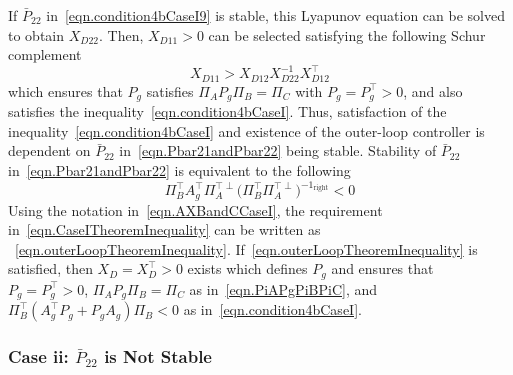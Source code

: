 \documentclass[journal]{IEEEtran}
\theoremstyle{innercustomthm}
\begin{document}
  If $\bar{P}_{22}$ in\ \eqref{eqn.condition4bCaseI9} is stable, this Lyapunov equation can be solved to obtain $X_{D22}$.
  Then, $X_{D11}>0$ can be selected satisfying the following Schur complement
  \begin{equation}
    \label{eqn.XD11}
    X_{D11} > X_{D12}X_{D22}^{-1}X_{D12}^{\top}
  \end{equation}
  which ensures that $P_{g}$ satisfies $\Pi_{A}P_{g}\Pi_{B}=\Pi_{C}$ with $P_{g}=P_{g}^{\top}>0$, and also satisfies the inequality\ \eqref{eqn.condition4bCaseI}.
  Thus, satisfaction of the inequality\ \eqref{eqn.condition4bCaseI} and existence of the outer-loop controller is dependent on $\bar{P}_{22}$ in\ \eqref{eqn.Pbar21andPbar22} being stable.
  Stability of $\bar{P}_{22}$ in\ \eqref{eqn.Pbar21andPbar22} is equivalent to the following
  \begin{equation}
    \label{eqn.CaseITheoremInequality}
    \Pi_{B}^{\top}A_{g}^{\top}\Pi_{A}^{\top\perp}\bigr(\Pi_{B}^{\top}\Pi_{A}^{\top\perp}\bigr)^{-1_{\text{right}}} < 0
  \end{equation}
  Using the notation in\ \eqref{eqn.AXBandCCaseI}, the requirement in\ \eqref{eqn.CaseITheoremInequality} can be written as
 \ \eqref{eqn.outerLoopTheoremInequality}.
  If\ \eqref{eqn.outerLoopTheoremInequality} is satisfied, then $X_{D}=X_{D}^{\top}>0$ exists which defines $P_{g}$ and ensures that $P_{g}=P_{g}^{\top}>0$, $\Pi_{A}P_{g}\Pi_{B}=\Pi_{C}$ as in\ \eqref{eqn.PiAPgPiBPiC}, and $\Pi_{B}^{\top}(A_{g}^{\top}P_{g}+P_{g}A_{g})\Pi_{B}<0$ as in\ \eqref{eqn.condition4bCaseI}.

  \subsubsection{Case ii: \texorpdfstring{$\bar{P}_{22}$}{P22} is Not Stable}
\end{document}
